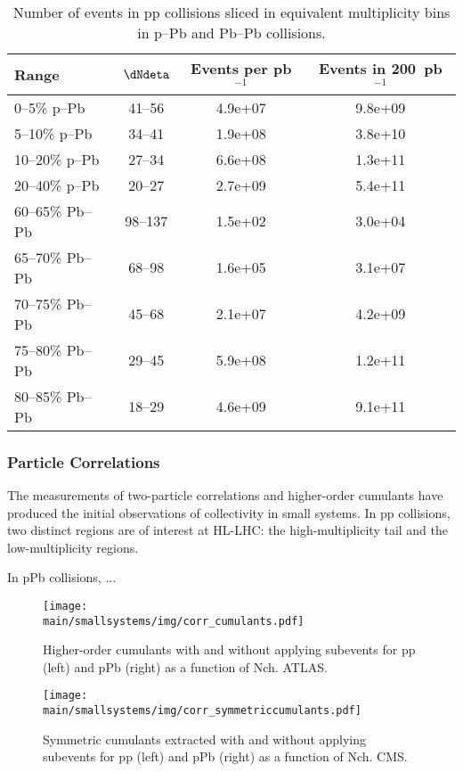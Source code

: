 \documentclass[../report.tex]{subfiles}
\providecommand{\main}{..}
\begin{document}
\begin{table}
\centering
\begin{tabular}{l|c|c|c}
Range & $\dNdeta$ & Events per pb$^{-1}$ & Events in 200~pb$^{-1}$ \\
\hline
0--5\% p--Pb   & 41--56        & 4.9e+07       & 9.8e+09 \\
5--10\% p--Pb  & 34--41        & 1.9e+08       & 3.8e+10 \\
10--20\% p--Pb & 27--34        & 6.6e+08       & 1.3e+11 \\
20--40\% p--Pb & 20--27        & 2.7e+09       & 5.4e+11 \\
\hline
60--65\% Pb--Pb    & 98--137       & 1.5e+02       & 3.0e+04 \\
65--70\% Pb--Pb    & 68--98        & 1.6e+05       & 3.1e+07 \\ 
70--75\% Pb--Pb    & 45--68        & 2.1e+07       & 4.2e+09 \\
75--80\% Pb--Pb    & 29--45        & 5.9e+08       & 1.2e+11 \\
80--85\% Pb--Pb    & 18--29        & 4.6e+09       & 9.1e+11 \\
\hline
\end{tabular}
\caption{Number of events in pp collisions sliced in equivalent multiplicity bins in p--Pb and Pb--Pb collisions.}
\end{table}



\subsubsection{Particle Correlations}

The measurements of two-particle correlations and higher-order cumulants have produced the initial observations of collectivity in small systems. In pp collisions, two distinct regions are of interest at HL-LHC: the high-multiplicity tail and the low-multiplicity regions. 

In pPb collisions, ...

\begin{figure}[ht]
\centering
\texttt{[image: \\main/smallsystems/img/corr\_cumulants.pdf]}
\caption{Higher-order cumulants with and without applying subevents for pp (left) and pPb (right) as a function of Nch. ATLAS.}
\label{fig:smallsystems_corr_cumulants}
\end{figure}

\begin{figure}[ht]
\centering
\texttt{[image: \\main/smallsystems/img/corr\_symmetriccumulants.pdf]}
\caption{Symmetric cumulants extracted with and without applying subevents for pp (left) and pPb (right) as a function of Nch. CMS.}
\label{fig:smallsystems_corr_symmetriccumulants}
\end{figure}
\end{document}
